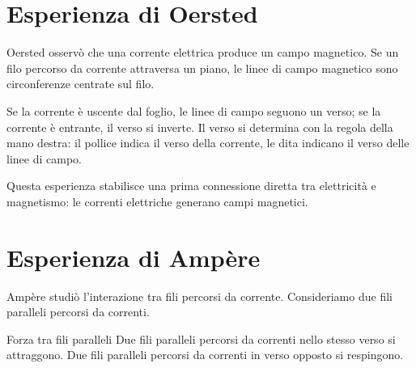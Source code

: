 \documentclass[a4paper]{article}
\begin{document}
\section{Esperienza di Oersted}

Oersted osservò che una corrente elettrica produce un campo magnetico. Se un filo percorso da corrente attraversa un piano, le linee di campo magnetico sono circonferenze centrate sul filo.

\begin{center}
\end{center}

Se la corrente è uscente dal foglio, le linee di campo seguono un verso; se la corrente è entrante, il verso si inverte. Il verso si determina con la regola della mano destra: il pollice indica il verso della corrente, le dita indicano il verso delle linee di campo.

\begin{center}
\end{center}

Questa esperienza stabilisce una prima connessione diretta tra elettricità e magnetismo: le correnti elettriche generano campi magnetici.

\section{Esperienza di Ampère}

Ampère studiò l'interazione tra fili percorsi da corrente. Consideriamo due fili paralleli percorsi da correnti.

\begin{snippetproposition}{Forza tra fili paralleli}
    Due fili paralleli percorsi da correnti nello stesso verso si attraggono. Due fili paralleli percorsi da correnti in verso opposto si respingono.
\end{snippetproposition}
\end{document}
